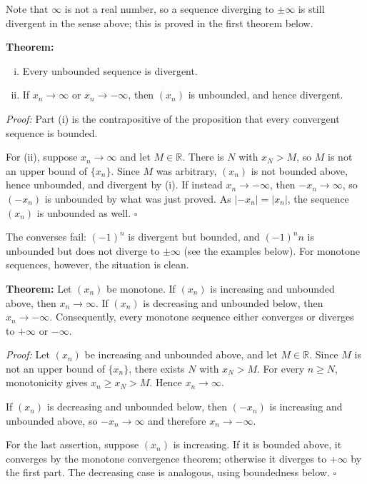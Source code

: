\documentclass[a4paper,11pt,abstracton]{scrartcl}
\newcommand{\RR}{\mathbb{R}}
\theoremstyle{dotlessP}
\theoremstyle{dotlessS}
\theoremstyle{remark}
\theoremstyle{definition}
\begin{document}
Note that $\infty$ is not a real number, so a sequence diverging to $\pm\infty$ is still divergent in the sense above; this is proved in the first theorem below.

\begin{problem_box}
\textbf{Theorem:}
\begin{enumerate}[(i)]
    \item Every unbounded sequence is divergent.
    \item If $x_n\rightarrow\infty$ or $x_n\rightarrow-\infty$, then $(x_n)$ is unbounded, and hence divergent.
\end{enumerate}
\end{problem_box}

\begin{claim_box}
\textit{Proof:}
Part (i) is the contrapositive of the proposition that every convergent sequence is bounded.

For (ii), suppose $x_n\rightarrow\infty$ and let $M\in\RR$. There is $N$ with $x_N>M$, so $M$ is not an upper bound of $\{x_n\}$. Since $M$ was arbitrary, $(x_n)$ is not bounded above, hence unbounded, and divergent by (i). If instead $x_n\rightarrow-\infty$, then $-x_n\rightarrow\infty$, so $(-x_n)$ is unbounded by what was just proved. As $|-x_n|=|x_n|$, the sequence $(x_n)$ is unbounded as well.
\hfill$\square$
\end{claim_box}

The converses fail: $(-1)^n$ is divergent but bounded, and $(-1)^nn$ is unbounded but does not diverge to $\pm\infty$ (see the examples below). For monotone sequences, however, the situation is clean.

\begin{problem_box}
\textbf{Theorem:}
Let $(x_n)$ be monotone. If $(x_n)$ is increasing and unbounded above, then $x_n\rightarrow\infty$. If $(x_n)$ is decreasing and unbounded below, then $x_n\rightarrow-\infty$. Consequently, every monotone sequence either converges or diverges to $+\infty$ or $-\infty$.
\end{problem_box}

\begin{claim_box}
\textit{Proof:}
Let $(x_n)$ be increasing and unbounded above, and let $M\in\RR$. Since $M$ is not an upper bound of $\{x_n\}$, there exists $N$ with $x_N>M$. For every $n\ge N$, monotonicity gives $x_n\ge x_N>M$. Hence $x_n\rightarrow\infty$.

If $(x_n)$ is decreasing and unbounded below, then $(-x_n)$ is increasing and unbounded above, so $-x_n\rightarrow\infty$ and therefore $x_n\rightarrow-\infty$.

For the last assertion, suppose $(x_n)$ is increasing. If it is bounded above, it converges by the monotone convergence theorem; otherwise it diverges to $+\infty$ by the first part. The decreasing case is analogous, using boundedness below.
\hfill$\square$
\end{claim_box}
\end{document}
